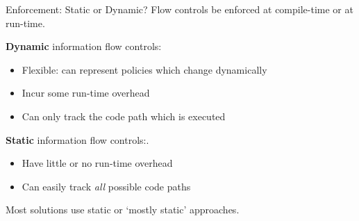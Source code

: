 %	

\begin{frame}{Enforcement: Static or Dynamic?}
	Flow controls be enforced at compile-time or at run-time.
	
	\textbf{Dynamic} information flow controls:
	\begin{itemize}
		\item Flexible: can represent policies which change dynamically
		\item Incur some run-time overhead
		\item Can only track the code path which is executed
	\end{itemize}
	
	\textbf{Static} information flow controls:.
	\begin{itemize}
		\item Have little or no run-time overhead
		\item Can easily track \textit{all} possible code paths
	\end{itemize}
	
	Most solutions use static or `mostly static' approaches.
\end{frame}

